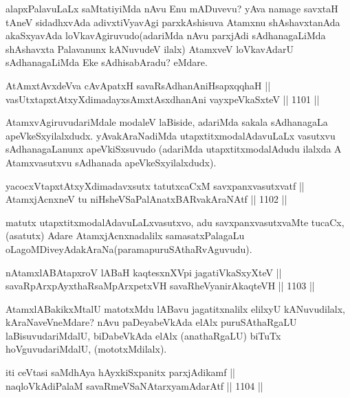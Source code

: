 \begin{artha}
alapxPalavuLaLx saMtatiyiMda nAvu Enu mADuvevu? yAva namage savxtaH tAneV sidadhxvAda adivxtiVyavAgi parxkAshisuva Atamxnu shAshavxtanAda akaSxyavAda loVkavAgiruvudo(adariMda nAvu parxjAdi sAdhanagaLiMda shAshavxta Palavanunx kANuvudeV ilalx) AtamxveV loVkavAdarU sAdhanagaLiMda Eke sAdhisabAradu? eMdare.
\end{artha}

\begin{shl}
AtAmxtAvxdeVva cAvApatxH savaRsAdhanAniHsapxqqhaH || \\
vasUtxtapxtAtxyXdimadayxsAmxtAsxdhanAni vayxpeVkaSxteV ||  1101 ||  
\end{shl}

\begin{artha}
AtamxvAgiruvudariMdale modaleV laBiside, adariMda sakala sAdhanagaLa apeVkeSxyilalxdudx. yAvakAraNadiMda utapxtitxmodalAdavuLaLx vasutxvu sAdhanagaLanunx apeVkiSxsuvudo (adariMda utapxtitxmodalAdudu ilalxda A Atamxvasutxvu sAdhanada apeVkeSxyilalxdudx).
\end{artha}

\begin{shl}
yacocxVtapxtAtxyXdimadavxsutx tatutxcaCxM savxpanxvasutxvatf || \\
AtamxjAcnxneV tu niHsheVSaPalAnatxBARvakAraNAtf ||  1102 ||  
\end{shl}

\begin{artha}
matutx utapxtitxmodalAdavuLaLxvasutxvo, adu savxpanxvasutxvaMte tucaCx, (asatutx) Adare AtamxjAcnxnadalilx samasatxPalagaLu oLagoMDiveyAdakAraNa(paramapuruSAthaRvAguvudu).
\end{artha}


\begin{shl}
nA\s \s tamxlABAtapxroV lABaH kaqtesxnXV\s pi jagatiVkaSxyXteV || \\
savaRpArxpAyxthaRsaMpArxpetxVH savaRheVyanirAkaqteVH ||  1103 ||  
\end{shl}

\begin{artha}
AtamxlABakikxMtalU matotxMdu lABavu jagatitxnalilx elilxyU kANuvudilalx, kAraNaveVneMdare? nAvu paDeyabeVkAda elAlx puruSAthaRgaLU laBisuvudariMdalU, biDabeVkAda elAlx (anathaRgaLU) biTuTx hoVguvudariMdalU, (mototxMdilalx).
\end{artha}

\begin{shl}
iti ceVtasi saMdhAya hAyxkiSxpanitx parxjAdikamf || \\
naqloVkAdiPalaM savaRmeVSaNAtarxyamAdarAtf ||  1104 ||  
\end{shl}


